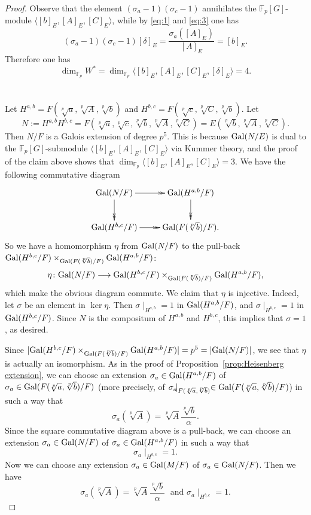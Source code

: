 \documentclass[12pt,leqno]{amsart}
\theoremstyle{plain}
\theoremstyle{definition}
\newcommand{\F}{{\mathbb F}}
\begin{document}
\begin{proof}
Observe that the element $(\sigma_a-1)(\sigma_c-1)$ annihilates the $\F_p[G]$-module $\langle [b]_E,[A]_E,[C]_E\rangle$, while by  \eqref{eq:1} and \eqref{eq:3} one has
\[
(\sigma_a-1)(\sigma_c-1)[\delta]_E= \frac{\sigma_a([A]_E)}{[A]_E}= [b]_E.
\]
Therefore one has
\[
\dim_{\F_p}W^*=\dim_{\F_p}\langle [b]_E,[A]_E,[C]_E,[\delta]_E\rangle =4.
\]
\\
\\
Let $H^{a,b}=F(\sqrt[p]{a},\sqrt[p]{A},\sqrt[p]{b})$ and $H^{b,c}=F(\sqrt[p]{c},\sqrt[p]{C},\sqrt[p]{b})$. 
Let 
\[N:=H^{a,b}H^{b,c}=F(\sqrt[p]{a},\sqrt[p]{c},\sqrt[p]{b},\sqrt[p]{A},\sqrt[p]{C})=E(\sqrt[p]{b},\sqrt[p]{A},\sqrt[p]{C}).\] 
Then $N/F$ is a Galois extension of degree $p^5$. 
This is because  ${\rm Gal}(N/E)$ is dual to the $\F_p[G]$-submodule $\langle  [b]_E,[A]_E,[C]_E \rangle$ via Kummer theory, 
and the proof of the claim above shows that $\dim_{\F_p}\langle [b]_E,[A]_E,[C]_E\rangle =3$. We have the following commutative diagram
\[
\xymatrix{
{\rm Gal}(N/F) \ar@{->>}[r] \ar@{->>}[d] & {\rm Gal}(H^{a,b}/F) \ar@{->>}[d]\\
{\rm Gal}(H^{b,c}/F) \ar@{->>}[r] & {\rm Gal}(F(\sqrt[p]{b})/F).
}
\]
So we have a homomorphism $\eta$ from ${\rm Gal}(N/F)$ to the pull-back ${\rm Gal}(H^{b,c}/F)\times_{{\rm Gal}(F(\sqrt[p]{b})/F)} {\rm Gal}(H^{a,b}/F)$:
\[
\eta\colon {\rm Gal}(N/F) \longrightarrow {\rm Gal}(H^{b,c}/F)\times_{{\rm Gal}(F(\sqrt[p]{b})/F)} {\rm Gal}(H^{a,b}/F),
\]
which make the obvious diagram commute.
We claim that $\eta$ is injective. Indeed, let $\sigma$ be an element in $\ker\eta$. Then $\sigma\mid_{H^{a,b}}=1$ in ${\rm Gal}(H^{a,b}/F)$, and $\sigma\mid_{H^{b,c}}=1$ in ${\rm Gal}(H^{b,c}/F)$. Since $N$ is the compositum of $H^{a,b}$ and $H^{b,c}$, this implies that $\sigma=1$, as desired. 

Since $|{\rm Gal}(H^{b,c}/F)\times_{{\rm Gal}(F(\sqrt[p]{b})/F)} {\rm Gal}(H^{a,b}/F)|=p^5=|{\rm Gal}(N/F)|$, we see that $\eta$ is actually an isomorphism.
As in the proof of Proposition~\ref{prop:Heisenberg extension}, we can choose an extension $\sigma_a\in {\rm Gal}(H^{a,b}/F)$ of $\sigma_a\in {\rm Gal}(F(\sqrt[p]{a},\sqrt[p]{b})/F)$ (more precisely, of $\sigma_a\hspace*{-5pt}\mid_{F(\sqrt[p]{a},\sqrt[p]{b})}\in {\rm Gal}(F(\sqrt[p]{a},\sqrt[p]{b})/F)$) in such a way that 
\[
\sigma_a(\sqrt[p]{A})= \sqrt[p]{A} \frac{\sqrt[p]{b}}{\alpha}.
\]
Since the square commutative diagram above is a pull-back, we can choose an extension  $\sigma_a\in {\rm Gal}(N/F)$ of $\sigma_a\in {\rm Gal}(H^{a,b}/F)$ in such a way that
\[
 \sigma_a\mid_{H^{b,c}}=1.
\]
Now we can choose any extension $\sigma_a\in {\rm Gal}(M/F)$ of $\sigma_a\in{\rm Gal}(N/F)$. Then we have
\[
\sigma_a(\sqrt[p]{A})= \sqrt[p]{A} \frac{\sqrt[p]{b}}{\alpha} \; \text{ and }  \sigma_a\mid_{H^{b,c}}=1.
\]


\end{proof}
\end{document}
